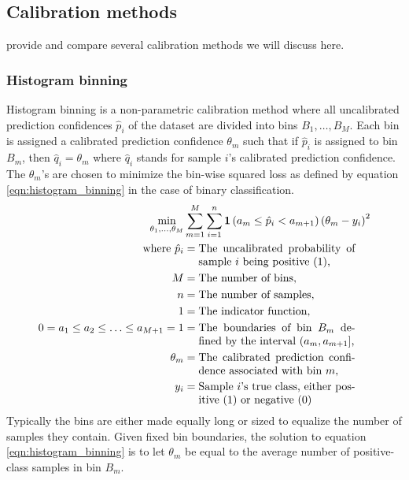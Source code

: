\subsection{Calibration methods}
\cite{guo2017calibration} provide and compare several calibration methods we will discuss here.

\subsubsection{Histogram binning}
Histogram binning is a non-parametric calibration method where all uncalibrated prediction confidences $\hat{p}_{i}$ of the dataset are divided into bins $B_{1}, \ldots, B_{M}$. Each bin is assigned a calibrated prediction confidence $\theta_{m}$ such that if $\hat{p}_{i}$ is assigned to bin $B_{m}$, then $\hat{q}_{i}=\theta_{m}$ where $\hat{q}_{i}$ stands for sample $i$'s calibrated prediction confidence. The $\theta_{m}$'s are chosen to minimize the bin-wise squared loss as defined by equation \ref{eqn:histogram_binning} in the case of binary classification.
\begin{align}
  \label{eqn:histogram_binning}
  \min_{\theta_{1}, \ldots, \theta_{M}} &\sum_{m=1}^{M} \sum_{i=1}^{n} \mathbf{1}\left(a_{m} \leq \hat{p}_{i}<a_{m+1}\right)\left(\theta_{m}-y_{i}\right)^{2} \\ \nonumber
  \text{where}~\hat{p}_{i} &= \parbox[t]{5cm}{The uncalibrated probability of sample $i$ being positive (1),} \\ \nonumber
  M &= \text{The number of bins}, \\ \nonumber
  n &= \text{The number of samples}, \\ \nonumber
  1 &= \text{The indicator function}, \\ \nonumber
  0=a_{1} \leq a_{2} \leq \ldots \leq a_{M+1}=1 &= \parbox[t]{5cm}{The boundaries of bin $B_{m}$ defined by the interval $\left(a_{m}, a_{m+1}\right]$,} \\ \nonumber
  \theta_{m} &= \parbox[t]{5cm}{The calibrated prediction confidence associated with bin $m$,} \\ \nonumber
  y_{i} &= \parbox[t]{5cm}{Sample $i$'s true class, either positive (1) or negative (0)}
\end{align}
Typically the bins are either made equally long or sized to equalize the number of samples they contain.
Given fixed bin boundaries, the solution to equation \ref{eqn:histogram_binning} is to let $\theta_{m}$ be equal to the average number of positive-class samples in bin $B_{m}$.

